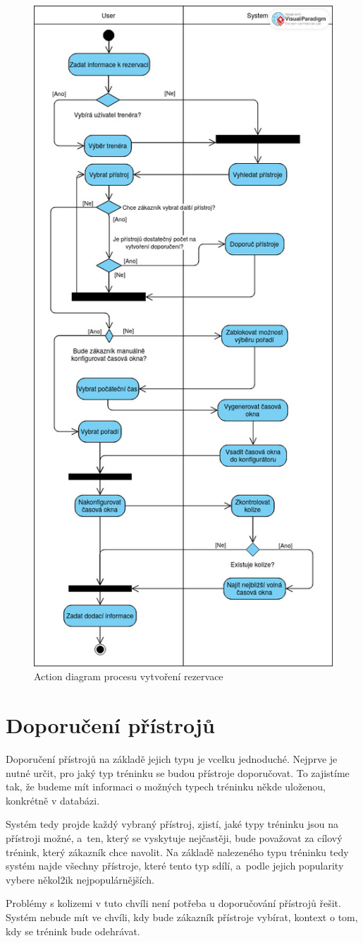 \begin{figure}
    \centering
    \includegraphics[width=.5\textwidth]{Figures/Bakalarka, rezervace.jpg}
    \caption{Action diagram procesu vytvoření rezervace}
    \label{fig:ReservationActionDiagram}
\end{figure}

\section{Doporučení přístrojů}
Doporučení přístrojů na základě jejich typu je vcelku jednoduché. Nejprve je nutné určit, pro jaký typ tréninku se budou přístroje doporučovat. To zajistíme tak, že budeme mít informaci o možných typech tréninku někde uloženou, konkrétně v databázi. 

Systém tedy projde každý vybraný přístroj, zjistí, jaké typy tréninku jsou na přístroji možné, a~ten, který se vyskytuje nejčastěji, bude považovat za cílový trénink, který zákazník chce navolit. Na základě nalezeného typu tréninku tedy systém najde všechny přístroje, které tento typ sdílí, a~podle jejich popularity vybere někol2ik nejpopulárnějších. 

Problémy s kolizemi v tuto chvíli není potřeba u doporučování přístrojů řešit. Systém nebude mít ve chvíli, kdy bude zákazník přístroje vybírat, kontext o tom, kdy se trénink bude odehrávat.

